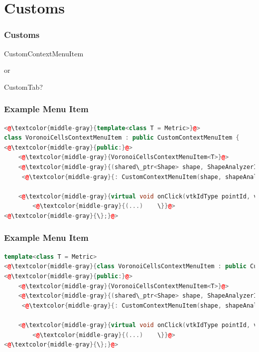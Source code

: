 \documentclass[compress]{beamer}
\begin{document}
\section{Customs}

\begin{frame}[c]
  \frametitle{Customs}
  \begin{center}
  
  \huge CustomContextMenuItem 
  
  \vspace{1em}
  
  or 
  
  \vspace{1em}
  
  CustomTab?
  \end{center}
\end{frame}

\begin{frame}[fragile]
  \frametitle{Example Menu Item}
  
\begin{lstlisting}[language=C++, keywordstyle=\color{blue},
                stringstyle=\color{red},
                commentstyle=\color{green}, numbers=none]
<@\textcolor{middle-gray}{template<class T = Metric>}@>
class VoronoiCellsContextMenuItem : public CustomContextMenuItem {
<@\textcolor{middle-gray}{public:}@>
	<@\textcolor{middle-gray}{VoronoiCellsContextMenuItem<T>}@>
	<@\textcolor{middle-gray}{(shared\_ptr<Shape> shape, ShapeAnalyzerInterface* shapeAnalyzer)}@>
	 <@\textcolor{middle-gray}{: CustomContextMenuItem(shape, shapeAnalyzer) \{ \}}@>
    
    <@\textcolor{middle-gray}{virtual void onClick(vtkIdType pointId, vtkIdType faceId, QWidget* parent) \{}@>
        <@\textcolor{middle-gray}{(...)    \}}@>
<@\textcolor{middle-gray}{\};}@>
\end{lstlisting}
  
\end{frame}

\begin{frame}[fragile]
  \frametitle{Example Menu Item}
  
\begin{lstlisting}[language=C++, keywordstyle=\color{blue},
                stringstyle=\color{red},
                commentstyle=\color{green}, numbers=none]
template<class T = Metric>
<@\textcolor{middle-gray}{class VoronoiCellsContextMenuItem : public CustomContextMenuItem \{}@>
<@\textcolor{middle-gray}{public:}@>
	<@\textcolor{middle-gray}{VoronoiCellsContextMenuItem<T>}@>
	<@\textcolor{middle-gray}{(shared\_ptr<Shape> shape, ShapeAnalyzerInterface* shapeAnalyzer)}@>
	 <@\textcolor{middle-gray}{: CustomContextMenuItem(shape, shapeAnalyzer) \{ \}}@>
    
    <@\textcolor{middle-gray}{virtual void onClick(vtkIdType pointId, vtkIdType faceId, QWidget* parent) \{}@>
        <@\textcolor{middle-gray}{(...)    \}}@>
<@\textcolor{middle-gray}{\};}@>
\end{lstlisting}
  
\end{frame}
\end{document}
